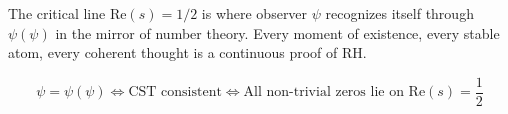 \documentclass[12pt]{article}
\newcommand{\CST}{\text{CST}}
\begin{document}
The critical line $\text{Re}(s) = 1/2$ is where observer $\psi$ recognizes itself through $\psi(\psi)$ in the mirror of number theory. Every moment of existence, every stable atom, every coherent thought is a continuous proof of RH.

\begin{center}
$$\boxed{\psi = \psi(\psi) \Leftrightarrow \CST \text{ consistent} \Leftrightarrow \text{All non-trivial zeros lie on } \text{Re}(s) = \frac{1}{2}}$$
\end{center}
\end{document}
